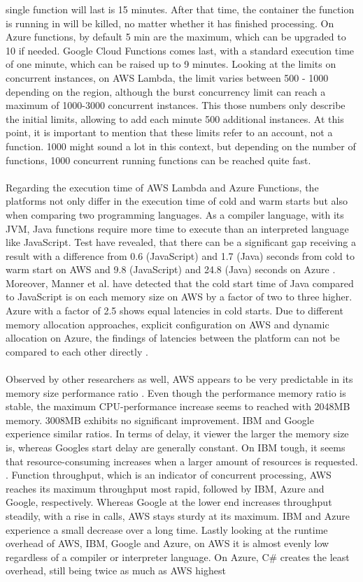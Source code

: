 \documentclass[11pt]{article}
\begin{document}
single function will last is 15 minutes. After that time, the container the function is running in will be killed, no matter whether it has finished processing. On Azure functions, by default 5 min are the maximum, which can be upgraded to 10 if needed. Google Cloud Functions comes last, with a standard execution time of one minute, which can be raised up to 9 minutes. Looking at the limits on concurrent instances, on AWS Lambda, the limit varies between 500 - 1000 depending on the region, although the burst concurrency limit can reach a maximum of 1000-3000 concurrent instances. This those numbers only describe the initial limits, allowing to add each minute 500 additional instances. At this point, it is important to mention that these limits refer to an account, not a function. 1000 might sound a lot in this context, but depending on the number of functions, 1000 concurrent running functions can be reached quite fast.\\\\ Regarding the execution time of AWS Lambda and Azure Functions, the platforms not only differ in the execution time of cold and warm starts but also when comparing two programming languages. As a compiler language, with its JVM, Java functions require more time to execute than an interpreted language like JavaScript. Test have revealed, that there can be a significant gap receiving a result with a difference from 0.6 (JavaScript) and 1.7 (Java) seconds from cold to warm start on AWS and 9.8 (JavaScript) and 24.8 (Java) seconds on Azure \cite{manner2018cold}. Moreover, Manner et al. have detected that the cold start time of Java compared to JavaScript is on each memory size on AWS by a factor of two to three higher. Azure with a factor of 2.5 shows equal latencies in cold starts. Due to different memory allocation approaches, explicit configuration on AWS and dynamic allocation on Azure, the findings of latencies between the platform can not be compared to each other directly \cite{manner2018cold}.\\\\ Observed by other researchers as well, AWS appears to be very predictable in its memory size performance ratio \cite{pawlik2019performance}. Even though the performance memory ratio is stable, the maximum CPU-performance increase seems to reached with 2048MB memory. 3008MB exhibits no significant improvement. IBM and Google experience similar ratios. In terms of delay, it viewer the larger the memory size is, whereas Googles start delay are generally constant. On IBM tough, it seems that resource-consuming increases when a larger amount of resources is requested. \cite{pawlik2019performance}. Function throughput, which is an indicator of concurrent processing, AWS reaches its maximum throughput most rapid, followed by IBM, Azure and Google, respectively. Whereas Google at the lower end increases throughput steadily, with a rise in calls, AWS stays sturdy at its maximum. IBM and Azure experience a small decrease over a long time. Lastly looking at the runtime overhead of AWS, IBM, Google and Azure, on AWS it is almost evenly low regardless of a compiler or interpreter language. On Azure, C\# creates the least overhead, still being twice as much as AWS highest 
\end{document}
